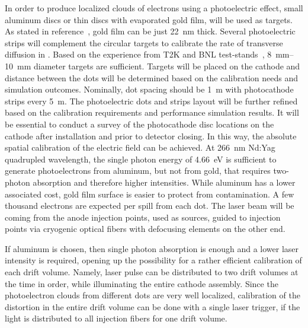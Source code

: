 In order to produce localized clouds of electrons using a photoelectric effect, small aluminum discs or thin discs with evaporated gold film, will be used as targets. As stated in reference~\cite{Li:2016ods}, gold film can be just \SI{22}{\nano\m} thick. Several photoelectric strips will complement the circular targets to calibrate the rate of transverse diffusion in . Based on the experience from T2K and BNL  test-stands~\cite{Li:2016ods}, \SIrange{8}{10}{\milli\m} diameter targets are sufficient. Targets will be placed on the cathode and distance between the dots will be determined based on the calibration needs and simulation outcomes. Nominally, dot spacing should be \SI{1}{\m} with photocathode strips every \SI{5}{\m}. The photoelectric dots and strips layout will be further refined based on the calibration requirements and performance simulation results. It will be essential to conduct a survey of the photocathode disc locations on the cathode  after installation and prior to detector closing. In this way, the absolute spatial calibration of the electric field can be achieved. 
At \SI{266}{\nano\m} Nd:Yag quadrupled wavelength, the single photon energy of \SI{4.66}{\eV} is sufficient to generate photoelectrons from aluminum, but not from gold, that requires two-photon absorption and therefore higher intensities.
While aluminum has a lower associated cost, gold film surface is easier to protect from contamination. 
A few thousand electrons are expected per spill from each dot. The laser beam will be coming from the anode injection points, used as sources, guided to injection points via cryogenic optical fibers with defocusing elements on the other end. 

If aluminum is chosen, then single photon absorption is enough and a lower laser intensity is required, opening up the 
possibility for a rather efficient calibration of each drift volume. Namely, laser pulse can be distributed to two drift volumes at the time in order, while illuminating the entire cathode assembly. Since the photoelectron clouds from different dots are very well localized, calibration of the \efield distortion in the entire drift volume can be done with a single laser trigger, if the light is distributed to all injection fibers for one drift volume. 

